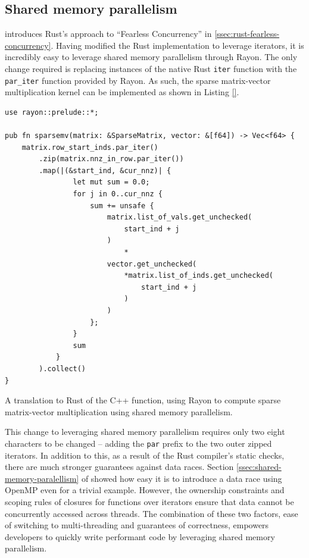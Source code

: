 \subsection{Shared memory parallelism}
\label{sec:translation-rayon}

 introduces Rust's approach to ``Fearless Concurrency'' in \ref{ssec:rust-fearless-concurrency}. Having modified the Rust implementation to leverage iterators, it is incredibly easy to leverage shared memory parallelism through Rayon. The only change required is replacing instances of the native Rust \texttt{iter} function with the \texttt{par\_iter} function provided by Rayon. As such, the sparse matrix-vector multiplication kernel can be implemented as shown in Listing \ref{}.

\begin{listing}[H]
    \begin{verbatim}
use rayon::prelude::*;

pub fn sparsemv(matrix: &SparseMatrix, vector: &[f64]) -> Vec<f64> {
    matrix.row_start_inds.par_iter()
        .zip(matrix.nnz_in_row.par_iter())
        .map(|(&start_ind, &cur_nnz)| {
                let mut sum = 0.0;
                for j in 0..cur_nnz {
                    sum += unsafe {
                        matrix.list_of_vals.get_unchecked(
                            start_ind + j
                        )
                            *
                        vector.get_unchecked(
                            *matrix.list_of_inds.get_unchecked(
                                start_ind + j
                            )
                        )
                    };
                }
                sum
            }
        ).collect()
}
    \end{verbatim}
    \caption{A translation to Rust of the C++ function, using Rayon to compute sparse matrix-vector multiplication using shared memory parallelism.}
    \label{listing:rust-sparsemv-rayon}
\end{listing}

This change to leveraging shared memory parallelism requires only two eight characters to be changed -- adding the \texttt{par} prefix to the two outer zipped iterators. In addition to this, as a result of the Rust compiler's static checks, there are much stronger guarantees against data races. Section \ref{ssec:shared-memory-paralellism} of  showed how easy it is to introduce a data race using OpenMP even for a trivial example. However, the ownership constraints and scoping rules of closures for functions over iterators ensure that data cannot be concurrently accessed across threads. The combination of these two factors, ease of switching to multi-threading and guarantees of correctness, empowers developers to quickly write performant code by leveraging shared memory parallelism.

